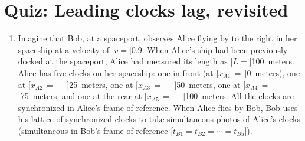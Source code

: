 \documentclass[pagesize,headsepline,10pt,parskip=half]{scrreprt}
\newcommand{\const}[1]{\mathrm{#1}}
\renewcommand{\c}{\const{c}}
\begin{document}
    \section{Quiz: Leading clocks lag, revisited}
      \begin{enumerate}
        \item
          Imagine that Bob, at a spaceport, observes Alice flying by to the right
          in her spaceship at a velocity of [$v = $]\SI{0.9}{\c}. When Alice’s ship
          had been previously docked at the spaceport, Alice had measured its length as
          [$L = $]100~meters.  Alice has five clocks on her spaceship: one in front
          (at [$x_{A1}\,=\,$]0~meters), one at [$x_{A2}\,=\,-$]25~meters, one at
          [$x_{A3}\,=\,-$]50~meters, one at [$x_{A4}\,=\,-$]75~meters, and one at
          the rear at [$x_{A5}\,=\,-$]100~meters. All the clocks are synchronized in
          Alice’s frame of reference.  When Alice flies by Bob, Bob uses his
          lattice of synchronized clocks to take simultaneous photos of Alice’s
          clocks (simultaneous in Bob’s frame of reference
          [$t_{B1} = t_{B2} = \cdots = t_{B5}$]).


\end{enumerate}
\end{document}
